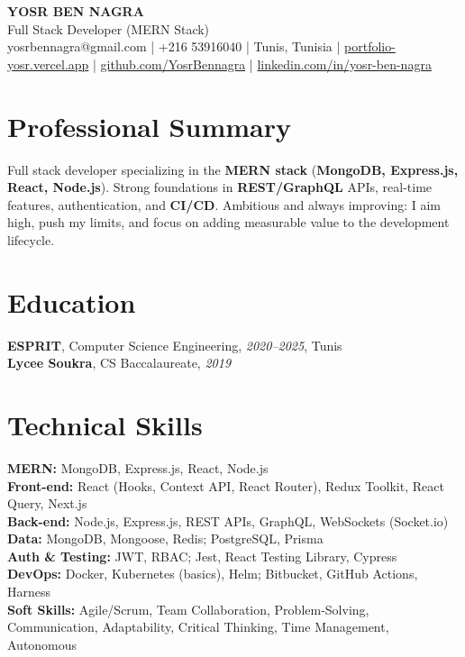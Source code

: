 \documentclass[10pt,a4paper]{article}
\begin{document}
\begin{center}
  {\Large\bfseries YOSR BEN NAGRA}\\[2pt]
  {\small Full Stack Developer (MERN Stack)}\\[3pt]
  {\footnotesize yosrbennagra@gmail.com \;|\; +216 53916040 \;|\; Tunis, Tunisia \;|\; \href{https://portfolio-yosr.vercel.app/en}{portfolio-yosr.vercel.app} \;|\; \href{https://github.com/YosrBennagra}{github.com/YosrBennagra} \;|\; \href{https://www.linkedin.com/in/yosr-ben-nagra/}{linkedin.com/in/yosr-ben-nagra}}
\end{center}

\section*{Professional Summary}
{\small
Full stack developer specializing in the \textbf{MERN stack} (\textbf{MongoDB, Express.js, React, Node.js}). Strong foundations in \textbf{REST/GraphQL} APIs, real-time features, authentication, and \textbf{CI/CD}. Ambitious and always improving: I aim high, push my limits, and focus on adding measurable value to the development lifecycle.
}

\vspace{4pt}

\section*{Education}
{\small
\textbf{ESPRIT}, Computer Science Engineering, \textit{2020--2025}, Tunis\\[1pt]
\textbf{Lycee Soukra}, CS Baccalaureate, \textit{2019}
}

\vspace{4pt}

\section*{Technical Skills}
{\small
\textbf{MERN:} MongoDB, Express.js, React, Node.js\\[2pt]
\textbf{Front-end:} React (Hooks, Context API, React Router), Redux Toolkit, React Query, Next.js\\[2pt]
\textbf{Back-end:} Node.js, Express.js, REST APIs, GraphQL, WebSockets (Socket.io)\\[2pt]
\textbf{Data:} MongoDB, Mongoose, Redis; PostgreSQL, Prisma\\[2pt]
\textbf{Auth \& Testing:} JWT, RBAC; Jest, React Testing Library, Cypress\\[2pt]
\textbf{DevOps:} Docker, Kubernetes (basics), Helm; Bitbucket, GitHub Actions, Harness\\[2pt]
\textbf{Soft Skills:} Agile/Scrum, Team Collaboration, Problem-Solving, Communication, Adaptability, Critical Thinking, Time Management, Autonomous
}
\end{document}
